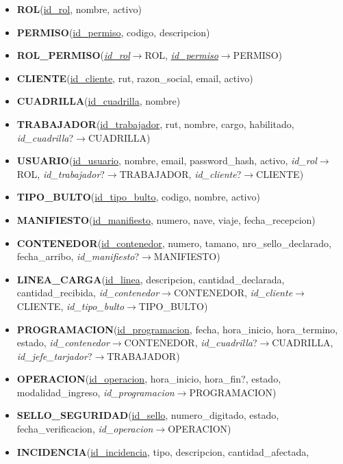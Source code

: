 {\small
\begin{itemize}
    \item \textbf{ROL}(\uline{id\_rol}, nombre, activo)
    \item \textbf{PERMISO}(\uline{id\_permiso}, codigo, descripcion)
    \item \textbf{ROL\_PERMISO}(\uline{\textit{id\_rol}}$\rightarrow$ROL,
    \uline{\textit{id\_permiso}}$\rightarrow$PERMISO)
    \item \textbf{CLIENTE}(\uline{id\_cliente}, rut, razon\_social, email, activo)
    \item \textbf{CUADRILLA}(\uline{id\_cuadrilla}, nombre)
    \item \textbf{TRABAJADOR}(\uline{id\_trabajador}, rut, nombre, cargo, habilitado,
    \textit{id\_cuadrilla}?$\rightarrow$CUADRILLA)
    \item \textbf{USUARIO}(\uline{id\_usuario}, nombre, email, password\_hash, activo,
    \textit{id\_rol}$\rightarrow$ROL, \textit{id\_trabajador}?$\rightarrow$TRABAJADOR,
    \textit{id\_cliente}?$\rightarrow$CLIENTE)
    \item \textbf{TIPO\_BULTO}(\uline{id\_tipo\_bulto}, codigo, nombre, activo)
    \item \textbf{MANIFIESTO}(\uline{id\_manifiesto}, numero, nave, viaje, fecha\_recepcion)
    \item \textbf{CONTENEDOR}(\uline{id\_contenedor}, numero, tamano, nro\_sello\_declarado,
    fecha\_arribo, \textit{id\_manifiesto}?$\rightarrow$MANIFIESTO)
    \item \textbf{LINEA\_CARGA}(\uline{id\_linea}, descripcion, cantidad\_declarada,
    cantidad\_recibida, \textit{id\_contenedor}$\rightarrow$CONTENEDOR,
    \textit{id\_cliente}$\rightarrow$CLIENTE, \textit{id\_tipo\_bulto}$\rightarrow$TIPO\_BULTO)
    \item \textbf{PROGRAMACION}(\uline{id\_programacion}, fecha, hora\_inicio, hora\_termino,
    estado, \textit{id\_contenedor}$\rightarrow$CONTENEDOR,
    \textit{id\_cuadrilla}?$\rightarrow$CUADRILLA,
    \textit{id\_jefe\_tarjador}?$\rightarrow$TRABAJADOR)
    \item \textbf{OPERACION}(\uline{id\_operacion}, hora\_inicio, hora\_fin?, estado,
    modalidad\_ingreso, \textit{id\_programacion}$\rightarrow$PROGRAMACION)
    \item \textbf{SELLO\_SEGURIDAD}(\uline{id\_sello}, numero\_digitado, estado,
    fecha\_verificacion, \textit{id\_operacion}$\rightarrow$OPERACION)
    \item \textbf{INCIDENCIA}(\uline{id\_incidencia}, tipo, descripcion, cantidad\_afectada,

\end{itemize}}
